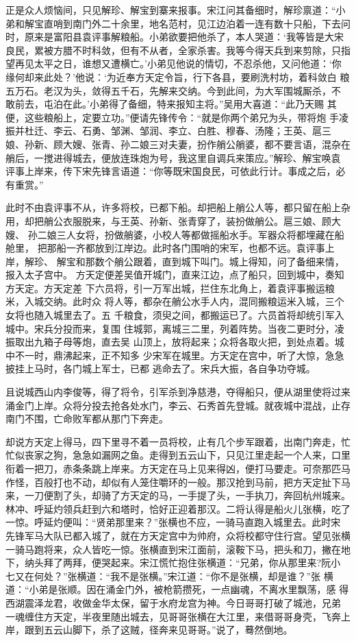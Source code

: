 正是众人烦恼间，只见解珍、解宝到寨来报事。宋江问其备细时，解珍禀道：“小
弟和解宝直哨到南门外二十余里，地名范村，见江边泊着一连有数十只船，下去问
时，原来是富阳县袁评事解粮船。小弟欲要把他杀了，本人哭道：‘我等皆是大宋
良民，累被方腊不时科敛，但有不从者，全家杀害。我等今得天兵到来剪除，只指
望再见太平之日，谁想又遭横亡。’小弟见他说的情切，不忍杀他，又问他道：‘你
缘何却来此处？’他说：‘为近奉方天定令旨，行下各县，要刷洗村坊，着科敛白
粮五万石。老汉为头，敛得五千石，先解来交纳。今到此间，为大军围城厮杀，不
敢前去，屯泊在此。’小弟得了备细，特来报知主将。”吴用大喜道：“此乃天赐
其便，这些粮船上，定要立功。”便请先锋传令：“就是你两个弟兄为头，带将炮
手凌振并杜迁、李云、石勇、邹渊、邹润、李立、白胜、穆春、汤隆；王英、扈三
娘、孙新、顾大嫂、张青、孙二娘三对夫妻，扮作艄公艄婆，都不要言语，混杂在
艄后，一搅进得城去，便放连珠炮为号，我这里自调兵来策应。”解珍、解宝唤袁
评事上岸来，传下宋先锋言语道：“你等既宋国良民，可依此行计。事成之后，必
有重赏。”

此时不由袁评事不从，许多将校，已都下船。却把船上艄公人等，都只留在船上杂
用，却把艄公衣服脱来，与王英、孙新、张青穿了，装扮做艄公。扈三娘、顾大嫂、
孙二娘三人女将，扮做艄婆，小校人等都做摇船水手。军器众将都埋藏在船舱里，
把那船一齐都放到江岸边。此时各门围哨的宋军，也都不远。袁评事上岸，解珍、
解宝和那数个艄公跟着，直到城下叫门。城上得知，问了备细来情，报入太子宫中。
方天定便差吴值开城门，直来江边，点了船只，回到城中，奏知方天定。方天定差
下六员将，引一万军出城，拦住东北角上，着袁评事搬运粮米，入城交纳。此时众
将人等，都杂在艄公水手人内，混同搬粮运米入城，三个女将也随入城里去了。五
千粮食，须臾之间，都搬运已了。六员首将却统引军入城中。宋兵分投而来，复围
住城郭，离城三二里，列着阵势。当夜二更时分，凌振取出九箱子母等炮，直去吴
山顶上，放将起来；众将各取火把，到处点着。城中不一时，鼎沸起来，正不知多
少宋军在城里。方天定在宫中，听了大惊，急急披挂上马时，各门城上军士，已都
逃命去了。宋兵大振，各自争功夺城。

且说城西山内李俊等，得了将令，引军杀到净慈港，夺得船只，便从湖里使将过来
涌金门上岸。众将分投去抢各处水门，李云、石秀首先登城。就夜城中混战，止存
南门不围，亡命败军都从那门下奔走。

却说方天定上得马，四下里寻不着一员将校，止有几个步军跟着，出南门奔走，忙
忙似丧家之狗，急急如漏网之鱼。走得到五云山下，只见江里走起一个人来，口里
衔着一把刀，赤条条跳上岸来。方天定在马上见来得凶，便打马要走。可奈那匹马
作怪，百般打也不动，却似有人笼住嚼环的一般。那汉抢到马前，把方天定扯下马
来，一刀便割了头，却骑了方天定的马，一手提了头，一手执刀，奔回杭州城来。
林冲、呼延灼领兵赶到六和塔时，恰好正迎着那汉。二将认得是船火儿张横，吃了
一惊。呼延灼便叫：“贤弟那里来？”张横也不应，一骑马直跑入城里去。此时宋
先锋军马大队已都入城了，就在方天定宫中为帅府，众将校都守住行宫。望见张横
一骑马跑将来，众人皆吃一惊。张横直到宋江面前，滚鞍下马，把头和刀，撇在地
下，纳头拜了两拜，便哭起来。宋江慌忙抱住张横道：“兄弟，你从那里来?阮小
七又在何处？”张横道：“我不是张横。”宋江道：“你不是张横，却是谁？”张
横道：“小弟是张顺。因在涌金门外，被枪箭攒死，一点幽魂，不离水里飘荡，感
得西湖震泽龙君，收做金华太保，留于水府龙宫为神。今日哥哥打破了城池，兄弟
一魂缠住方天定，半夜里随出城去，见哥哥张横在大江里，来借哥哥身壳，飞奔上
岸，跟到五云山脚下，杀了这贼，径奔来见哥哥。”说了，蓦然倒地。

